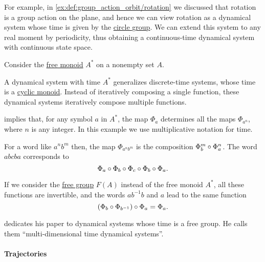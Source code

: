 \begin{example}
\begin{thmenum}
    For example, in \cref{ex:def:group_action_orbit/rotation} we discussed that rotation is a group action on the plane, and hence we can view rotation as a dynamical system whose time is given by the \hyperref[def:circle_group]{circle group}. We can extend this system to any real moment by periodicity, thus obtaining a continuous-time dynamical system with continuous state space.

     Consider the \hyperref[def:free_monoid]{free monoid} \( A^* \) on a nonempty set \( A \).

    A dynamical system with time \( A^* \) generalizes discrete-time systems, whose time is a \hyperref[def:cyclic_monoid]{cyclic monoid}. Instead of iteratively composing a single function, these dynamical systems iteratively compose multiple functions.

     implies that, for any symbol \( a \) in \( A^* \), the map \( \Phi_a \) determines all the maps \( \Phi_{a^n} \), where \( n \) is any integer. In this example we use multiplicative notation for time.

    For a word like \( a^n b^m \) then, the map \( \Phi_{a^n b^m} \) is the composition \( \Phi_b^m \bincirc \Phi_a^n \). The word \( abcba \) corresponds to
    \begin{equation*}
      \Phi_a \bincirc \Phi_b \bincirc \Phi_c \bincirc \Phi_b \bincirc \Phi_a.
    \end{equation*}

    If we consider the \hyperref[def:free_group]{free group} \( F(A) \) instead of the free monoid \( A^* \), all these functions are invertible, and the words \( ab^{-1}b \) and \( a \) lead to the same function
    \begin{equation*}
      (\Phi_b \bincirc \Phi_{b^{-1}}) \bincirc \Phi_a = \Phi_a.
    \end{equation*}

     dedicates his paper to dynamical systems whose time is a free group. He calls them \enquote{multi-dimensional time dynamical systems}.
  \end{thmenum}
\end{example}

\paragraph{Trajectories}

